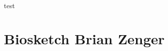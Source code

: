 \documentclass[11pt]{report}
\begin{document}
\thispagestyle{empty}  %

\newpage

\tableofcontents
\newpage

%
%
%


% 


\newpage
test
%

%

\section{Biosketch Brian Zenger}

\newpage

% 
%


%
\end{document}
